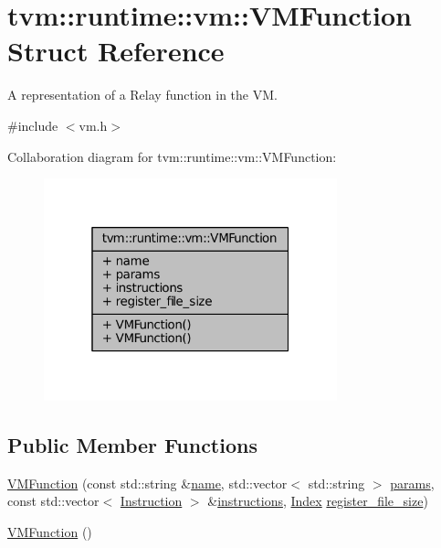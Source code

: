 \hypertarget{structtvm_1_1runtime_1_1vm_1_1VMFunction}{}\section{tvm\+:\+:runtime\+:\+:vm\+:\+:V\+M\+Function Struct Reference}
\label{structtvm_1_1runtime_1_1vm_1_1VMFunction}


A representation of a Relay function in the VM.  




{\ttfamily \#include $<$vm.\+h$>$}



Collaboration diagram for tvm\+:\+:runtime\+:\+:vm\+:\+:V\+M\+Function\+:
\nopagebreak
\begin{figure}[H]
\begin{center}
\leavevmode
\includegraphics[width=241pt]{structtvm_1_1runtime_1_1vm_1_1VMFunction__coll__graph}
\end{center}
\end{figure}
\subsection*{Public Member Functions}
\begin{DoxyCompactItemize}
\item 
\hyperlink{structtvm_1_1runtime_1_1vm_1_1VMFunction_a49ca45b1b44655ea5e4fbb74966e0b35}{V\+M\+Function} (const std\+::string \&\hyperlink{structtvm_1_1runtime_1_1vm_1_1VMFunction_ae2f6bf699f51fb33d1659d88ff6855e0}{name}, std\+::vector$<$ std\+::string $>$ \hyperlink{structtvm_1_1runtime_1_1vm_1_1VMFunction_a6d480483112097888c71501504665693}{params}, const std\+::vector$<$ \hyperlink{structtvm_1_1runtime_1_1vm_1_1Instruction}{Instruction} $>$ \&\hyperlink{structtvm_1_1runtime_1_1vm_1_1VMFunction_a046985e3f5a2b4201298555514d5d356}{instructions}, \hyperlink{namespacetvm_1_1runtime_1_1vm_a3597867d2db714bf760876a23d6b7d3d}{Index} \hyperlink{structtvm_1_1runtime_1_1vm_1_1VMFunction_a5b910095e5c2826cf57793afb4f2078a}{register\+\_\+file\+\_\+size})
\item 
\hyperlink{structtvm_1_1runtime_1_1vm_1_1VMFunction_ac0a863bff962be11a964e569c9fb2df3}{V\+M\+Function} ()
\end{DoxyCompactItemize}
